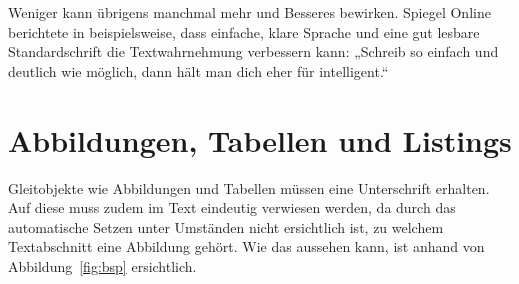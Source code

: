 \documentclass[
    12pt,
    headings=small,
    parskip=half,           %
    bibliography=totoc,
    numbers=noenddot,       %
    open=any,               %
    ]{scrreprt}
\begin{document}
Weniger kann übrigens manchmal mehr und Besseres bewirken. Spiegel Online berichtete in \cite{textwahrnehmung} beispielsweise, dass einfache, klare Sprache und eine gut lesbare Standardschrift die Textwahrnehmung verbessern kann: „Schreib so einfach und deutlich wie möglich, dann hält man dich eher für intelligent.“

\section{Abbildungen, Tabellen und Listings}

Gleitobjekte wie Abbildungen und Tabellen müssen eine Unterschrift erhalten. Auf diese muss zudem im Text eindeutig verwiesen werden, da durch das automatische Setzen unter Umständen nicht ersichtlich ist, zu welchem Textabschnitt eine Abbildung gehört. Wie das aussehen kann, ist anhand von Abbildung~\ref{fig:bsp} ersichtlich.
\end{document}
